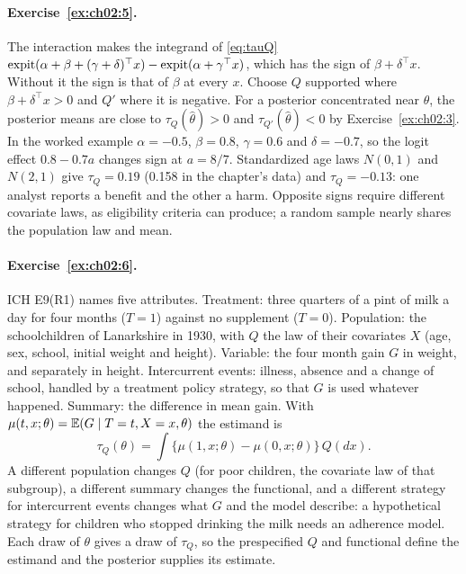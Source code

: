 \paragraph{Exercise~\ref{ex:ch02:5}.} The interaction makes the integrand of \eqref{eq:tauQ} $\operatorname{expit}(\alpha+\beta+(\gamma+\delta)^\top x)-\operatorname{expit}(\alpha+\gamma^\top x)$, which has the sign of $\beta+\delta^\top x$. Without it the sign is that of $\beta$ at every $x$. Choose $Q$ supported where $\beta+\delta^\top x>0$ and $Q'$ where it is negative. For a posterior concentrated near $\hat\theta$, the posterior means are close to $\tau_Q(\hat\theta)>0$ and $\tau_{Q'}(\hat\theta)<0$ by Exercise~\ref{ex:ch02:3}. In the worked example $\alpha=-0.5$, $\beta=0.8$, $\gamma=0.6$ and $\delta=-0.7$, so the logit effect $0.8-0.7a$ changes sign at $a=8/7$. Standardized age laws $N(0,1)$ and $N(2,1)$ give $\tau_Q=0.19$ (0.158 in the chapter's data) and $\tau_Q=-0.13$: one analyst reports a benefit and the other a harm. Opposite signs require different covariate laws, as eligibility criteria can produce; a random sample nearly shares the population law and mean.

\paragraph{Exercise~\ref{ex:ch02:6}.} ICH E9(R1) names five attributes. Treatment: three quarters of a pint of milk a day for four months ($T = 1$) against no supplement ($T = 0$). Population: the schoolchildren of Lanarkshire in 1930, with $Q$ the law of their covariates $X$ (age, sex, school, initial weight and height). Variable: the four month gain $G$ in weight, and separately in height. Intercurrent events: illness, absence and a change of school, handled by a treatment policy strategy, so that $G$ is used whatever happened. Summary: the difference in mean gain. With $\mu(t, x; \theta) = \mathbb{E}(G \mid T = t, X = x, \theta)$ the estimand is
\[
\tau_Q(\theta) = \int \{\mu(1, x; \theta) - \mu(0, x; \theta)\}\,Q(dx).
\]
A different population changes $Q$ (for poor children, the covariate law of that subgroup), a different summary changes the functional, and a different strategy for intercurrent events changes what $G$ and the model describe: a hypothetical strategy for children who stopped drinking the milk needs an adherence model. Each draw of $\theta$ gives a draw of $\tau_Q$, so the prespecified $Q$ and functional define the estimand and the posterior supplies its estimate.

